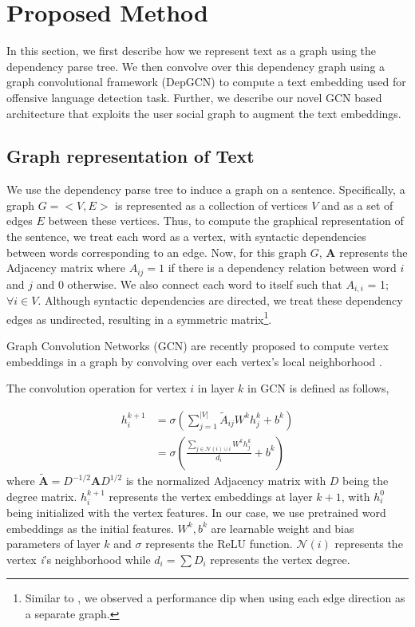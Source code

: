 \section{Proposed Method}
In this section, we first describe how we represent text as a graph using the dependency parse tree. We then convolve over this dependency graph using a graph convolutional framework (DepGCN) to compute a text embedding used for offensive language detection task. Further, we describe our novel GCN based architecture that exploits the user social graph to augment the text embeddings.

\subsection{Graph representation of Text}
We use the dependency parse tree to induce a graph on a sentence. Specifically, a graph $G = < V, E > $ is represented as a collection of vertices $V$ and as a set of edges $E$ between these vertices. Thus, to compute the graphical representation of the sentence, we treat each word as a vertex, with syntactic dependencies between words corresponding to an edge. Now, for this graph $G$, $\textbf{A}$ represents the Adjacency matrix where $A_{ij} = 1$ if there is a dependency relation between word $i$ and $j$ and $0$ otherwise. We also connect each word to itself such that $A_{i,i}$ = 1; $\forall i \in V$. Although syntactic dependencies are directed, we treat these dependency edges as undirected, resulting in a symmetric matrix\footnote{Similar to \cite{zhang-graph}, we observed a performance dip when using each edge direction as a separate graph.}.

Graph Convolution Networks (GCN) are recently proposed to compute vertex embeddings in a graph by convolving over each vertex's local neighborhood \cite{kipf2016semi}.

The convolution operation for vertex $i$ in layer $k$ in GCN is defined as follows,

\begin{align}
    h_i^{k+1} &= \sigma \left ( \sum_{j = 1}^{|V|}  \tilde{A}_{ij} W^k h_j^k + b^k  \right ) \\
    &= \sigma \left ( \frac{ \sum\limits_{j \in \mathcal{N}(i) \cup i} W^k h_j^k} {d_i} + b^k  \right )
\end{align}
where $\mathbf{\tilde{A}} = D^{-1/2}\mathbf{A}D^{1/2}$ is the normalized Adjacency matrix with $D$ being the degree matrix. $h_i^{k+1}$ represents the vertex embeddings at layer $k+1$, with $h_i^0$ being initialized with the vertex features. In our case, we use pretrained word embeddings as the initial features.
$W^k, b^k$ are learnable weight and bias parameters of layer $k$ and $\sigma$ represents the ReLU function. $\mathcal{N}(i)$ represents the vertex \emph{i}'s neighborhood while $d_i = \sum {D}_i$ represents the vertex degree.

